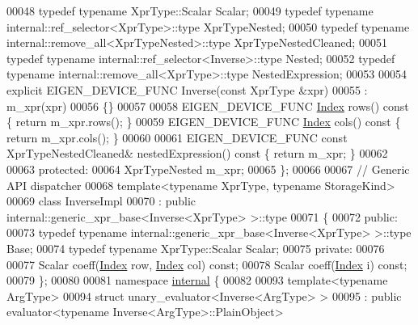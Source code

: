 \begin{DoxyCode}
00048   \textcolor{keyword}{typedef} \textcolor{keyword}{typename} XprType::Scalar                            Scalar;
00049   \textcolor{keyword}{typedef} \textcolor{keyword}{typename} internal::ref\_selector<XprType>::type      XprTypeNested;
00050   \textcolor{keyword}{typedef} \textcolor{keyword}{typename} internal::remove\_all<XprTypeNested>::type  XprTypeNestedCleaned;
00051   \textcolor{keyword}{typedef} \textcolor{keyword}{typename} internal::ref\_selector<Inverse>::type Nested;
00052   \textcolor{keyword}{typedef} \textcolor{keyword}{typename} internal::remove\_all<XprType>::type NestedExpression;
00053   
00054   \textcolor{keyword}{explicit} EIGEN\_DEVICE\_FUNC Inverse(\textcolor{keyword}{const} XprType &xpr)
00055     : m\_xpr(xpr)
00056   \{\}
00057 
00058   EIGEN\_DEVICE\_FUNC \hyperlink{namespace_eigen_a62e77e0933482dafde8fe197d9a2cfde}{Index} rows()\textcolor{keyword}{ const }\{ \textcolor{keywordflow}{return} m\_xpr.rows(); \}
00059   EIGEN\_DEVICE\_FUNC \hyperlink{namespace_eigen_a62e77e0933482dafde8fe197d9a2cfde}{Index} cols()\textcolor{keyword}{ const }\{ \textcolor{keywordflow}{return} m\_xpr.cols(); \}
00060 
00061   EIGEN\_DEVICE\_FUNC \textcolor{keyword}{const} XprTypeNestedCleaned& nestedExpression()\textcolor{keyword}{ const }\{ \textcolor{keywordflow}{return} m\_xpr; \}
00062 
00063 \textcolor{keyword}{protected}:
00064   XprTypeNested m\_xpr;
00065 \};
00066 
00067 \textcolor{comment}{// Generic API dispatcher}
00068 \textcolor{keyword}{template}<\textcolor{keyword}{typename} XprType, \textcolor{keyword}{typename} StorageKind>
00069 \textcolor{keyword}{class }InverseImpl
00070   : \textcolor{keyword}{public} internal::generic\_xpr\_base<Inverse<XprType> >::type
00071 \{
00072 \textcolor{keyword}{public}:
00073   \textcolor{keyword}{typedef} \textcolor{keyword}{typename} internal::generic\_xpr\_base<Inverse<XprType> >::type Base;
00074   \textcolor{keyword}{typedef} \textcolor{keyword}{typename} XprType::Scalar Scalar;
00075 \textcolor{keyword}{private}:
00076 
00077   Scalar coeff(\hyperlink{namespace_eigen_a62e77e0933482dafde8fe197d9a2cfde}{Index} row, \hyperlink{namespace_eigen_a62e77e0933482dafde8fe197d9a2cfde}{Index} col) \textcolor{keyword}{const};
00078   Scalar coeff(\hyperlink{namespace_eigen_a62e77e0933482dafde8fe197d9a2cfde}{Index} i) \textcolor{keyword}{const};
00079 \};
00080 
00081 \textcolor{keyword}{namespace }\hyperlink{namespaceinternal}{internal} \{
00082 
00093 \textcolor{keyword}{template}<\textcolor{keyword}{typename} ArgType>
00094 \textcolor{keyword}{struct }unary\_evaluator<Inverse<ArgType> >
00095   : \textcolor{keyword}{public} evaluator<typename Inverse<ArgType>::PlainObject>

\end{DoxyCode}
